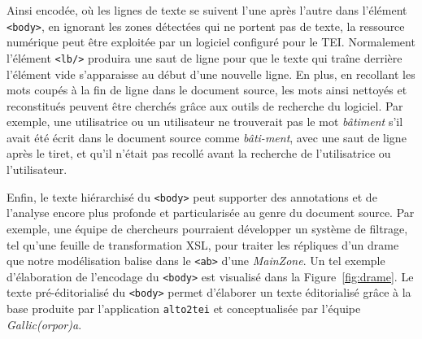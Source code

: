 \documentclass[class=article, crop=false]{standalone}
\begin{document}
Ainsi encodée, où les lignes de texte se suivent l'une après l'autre dans l'élément \texttt{<body>}, en ignorant les zones détectées qui ne portent pas de texte, la ressource numérique peut être exploitée par un logiciel configuré pour le \acrshort{TEI}. Normalement l'élément \texttt{<lb/>} produira une saut de ligne pour que le texte qui traîne derrière l'élément vide s'apparaisse au début d'une nouvelle ligne. En plus, en recollant les mots coupés à la fin de ligne dans le document source, les mots ainsi nettoyés et reconstitués peuvent être cherchés grâce aux outils de recherche du logiciel. Par exemple, une utilisatrice ou un utilisateur ne trouverait pas le mot \textit{bâtiment} s'il avait été écrit dans le document source comme \textit{bâti-ment}, avec une saut de ligne après le tiret, et qu'il n'était pas recollé avant la recherche de l'utilisatrice ou l'utilisateur.

Enfin, le texte hiérarchisé du \texttt{<body>} peut supporter des annotations et de l'analyse encore plus profonde et particularisée au genre du document source. Par exemple, une équipe de chercheurs pourraient développer un système de filtrage, tel qu'une feuille de transformation XSL, pour traiter les répliques d'un drame que notre modélisation balise dans le \texttt{<ab>} d'une \textit{MainZone}. Un tel exemple d'élaboration de l'encodage du \texttt{<body>} est visualisé dans la Figure~\ref{fig:drame}. Le texte pré-éditorialisé du \texttt{<body>} permet d'élaborer un texte éditorialisé grâce à la base produite par l'application \texttt{alto2tei} et conceptualisée par l'équipe \textit{Gallic(orpor)a}.
\end{document}

